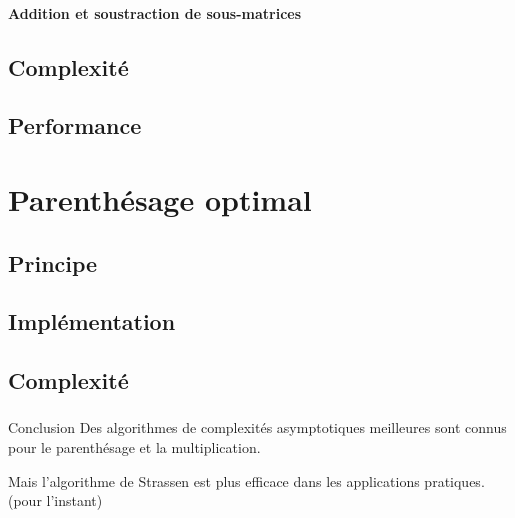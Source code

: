 \documentclass{beamer}
\begin{document}
\begin{frame}
  \framesubtitle{Addition et soustraction de sous-matrices}
\end{frame}
\subsection{Complexité}
\begin{frame}
  \frametitle{\insertsubsection}
\end{frame}


\subsection{Performance}
\begin{frame}
\end{frame}


\section{Parenthésage optimal}
\subsection{Principe}
\begin{frame}
  \frametitle{\insertsubsection}
\end{frame}

\subsection{Implémentation}
\begin{frame}
  \frametitle{\insertsubsection}
\end{frame}

\subsection{Complexité}
\begin{frame}
  \frametitle{\insertsubsection}
\end{frame}



\begin{frame}{Conclusion}
  Des algorithmes de complexités asymptotiques meilleures
  sont connus pour le parenthésage et la multiplication.

  Mais l'algorithme de Strassen est plus efficace dans les
  applications pratiques. (pour l'instant)
\end{frame}
\end{document}
